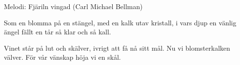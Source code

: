 \begin{song}

\begin{songmeta}
Melodi: Fjäriln vingad (Carl Michael Bellman)
\end{songmeta}

\begin{songtext}
Som en blomma på en stängel,
med en kalk utav kristall,
i vars djup en vänlig ängel
fällt en tår så klar och så kall.

Vinet står på lut och skälver,
ivrigt att få nå sitt mål.
Nu vi blomsterkalken välver.
För vår vänskap höja vi en skål.
\end{songtext}
\end{song}
